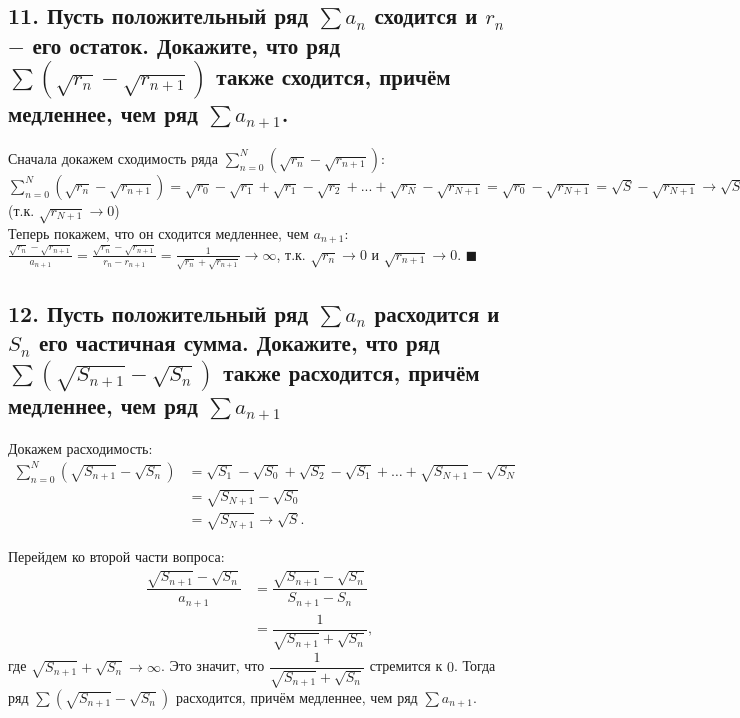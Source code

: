 \documentclass[a4paper, fleqn]{article}
\begin{document}
    \subsection*{11. Пусть положительный ряд $\sum a_n$ сходится и $r_n$ $-$ его остаток. Докажите, что ряд $\sum(\sqrt{r_n} - \sqrt{r_{n + 1}})$ также сходится, причём медленнее, чем ряд $\sum a_{n + 1}$.}
    Сначала докажем сходимость ряда $\sum\limits_{n = 0}^N (\sqrt{r_n} - \sqrt{r_{n + 1}})$:\\
    $\sum\limits_{n = 0}^N (\sqrt{r_n} - \sqrt{r_{n + 1}}) = \sqrt{r_0} - \sqrt{r_1} + \sqrt{r_1} - \sqrt{r_2} + ... + \sqrt{r_N} - \sqrt{r_{N+1}} = \sqrt{r_0} - \sqrt{r_{N+1}} = \sqrt{S} - \sqrt{r_{N+1}} \rightarrow \sqrt{S}$ (т.к. $\sqrt{r_{N+1}} \rightarrow 0$) \\
    Теперь покажем, что он сходится медленнее, чем $a_{n+1}$: \\
    $\frac{\sqrt{r_n} - \sqrt{r_{n + 1}}}{a_{n+1}} = \frac{\sqrt{r_n} - \sqrt{r_{n + 1}}}{r_n - r_{n+1}} = \frac{1}{\sqrt{r_n} + \sqrt{r_{n + 1}}} \rightarrow \infty$, т.к. $\sqrt{r_n} \rightarrow 0$ и $\sqrt{r_{n + 1}} \rightarrow 0$. $\blacksquare$ \\
    
        \subsection*{12. Пусть положительный ряд $\sum a_n$ расходится и $S_n$ его частичная сумма. Докажите, что ряд $\sum (\sqrt{S_{n+1}} - \sqrt{S_n})$ также расходится, причём медленнее, чем ряд $\sum a_{n+1}$}

        Докажем расходимость:
        \begin{align*}
            \sum_{n=0}^{N} (\sqrt{S_{n+1}} - \sqrt{S_n}) 
            &= \sqrt{S_1} - \sqrt{S_0} + \sqrt{S_2} - \sqrt{S_1} + \dots + \sqrt{S_{N+1}} - \sqrt{S_{N}} \\
            &= \sqrt{S_{N+1}} - \sqrt{S_0} \\
            &= \sqrt{S_{N+1}} \to \sqrt{S}.
        \end{align*}

        Перейдем ко второй части вопроса:
        \begin{align*}
            \dfrac{\sqrt{S_{n+1}} - \sqrt{S_n}}{a_{n+1}} 
            &= \dfrac{\sqrt{S_{n+1}} - \sqrt{S_n}}{S_{n+1} - S_n} \\
            &= \dfrac{1}{\sqrt{S_{n+1}} + \sqrt{S_n}},
        \end{align*}
        где $\sqrt{S_{n+1}} + \sqrt{S_n} \to \infty$. Это значит, что $\dfrac{1}{\sqrt{S_{n+1}} + \sqrt{S_n}}$ стремится к $0$. Тогда ряд $\sum (\sqrt{S_{n+1}} - \sqrt{S_n})$ расходится, причём медленнее, чем ряд $\sum a_{n+1}$.
    
\end{document}
